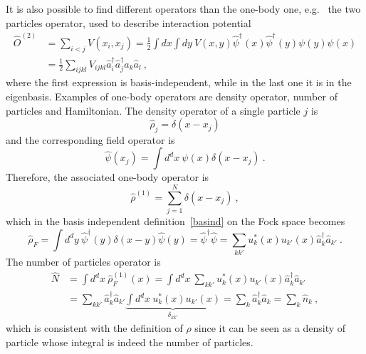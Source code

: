     It is also possible to find different operators than the one-body one, e.g.~ the two particles operator, used to describe interaction potential 
    \begin{equation*}
    \begin{aligned}
        \hat O^{(2)} & = \sum_{i < j} V(x_i, x_j) = \frac{1}{2} \int dx \int dy ~ V(x,y) \hat \psi^\dagger (x) \hat \psi^\dagger (y) \psi(y) \psi (x) \\ & = \frac{1}{2} \sum_{ijkl} V_{ijkl} \hat a_i^\dagger \hat a_j^\dagger \hat a_k \hat a_l ~,
    \end{aligned}
    \end{equation*}
    where the first expression is basis-independent, while in the last one it is in the eigenbasis. Examples of one-body operators are density operator, number of particles and Hamiltonian.
    The density operator of a single particle $j$ is 
    \begin{equation*}
        \hat \rho_j = \delta (x - x_j)
    \end{equation*}
    and the corresponding field operator is 
    \begin{equation*}
        \hat \psi (x_j) = \int d^d x ~ \psi (x) \delta (x - x_j) ~.
    \end{equation*}
    Therefore, the associated one-body operator is 
    \begin{equation*}
        \hat \rho^{(1)} = \sum_{j=1}^{N} \delta (x - x_j) ~,
    \end{equation*}
    which in the basis independent definition~\eqref{basind} on the Fock space becomes
    \begin{equation*}
        \hat \rho_F = \int d^d y ~ \hat \psi^\dagger (y) \delta (x - y) \hat \psi (y) = \hat \psi^\dagger \hat \psi = \sum_{kk'} u_k^* (x) u_{k'} (x) \hat a^\dagger_k \hat a_{k'} ~.
    \end{equation*}
    The number of particles operator is 
    \begin{equation*}
    \begin{aligned}
        \hat N & = \int d^d x ~ \hat \rho^{(1)}_F (x) = \int d^d x ~ \sum_{kk'} u^*_k (x) u_{k'} (x) \hat a^\dagger_k \hat a_{k'} \\ & = \sum_{kk'} \hat a^\dagger_k \hat a_{k'} \underbrace{\int d^d x ~ u^*_k (x) u_{k'} (x)}_{\delta_{kk'}} = \sum_k \hat a^\dagger_k \hat a_k = \sum_k \hat n_k ~,
    \end{aligned}
    \end{equation*}
    which is consistent with the definition of $\rho$ since it can be seen as a density of particle whose integral is indeed the number of particles.

